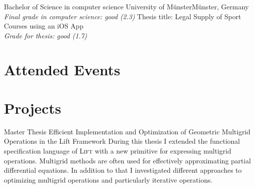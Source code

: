 \documentclass[11pt,a4paper,sans]{moderncv}        %
\newcommand{\Lift}{\textsc{Lift}\xspace}
\begin{document}
                        {Bachelor of Science in computer science}
					{University of Münster}{Münster, Germany}
					{\textit{Final grade in computer science: good (2.3)}}
					{Thesis title: Legal Supply of Sport Courses using an iOS App \\
					 \textit{Grade for thesis: good (1.7)}
					}
					
					

\section{Attended Events}


\printbibheading[title={Publications}]
%
\printbibliography[heading=none]





\section{Projects}
					{Master Thesis}
					{Efficient Implementation and Optimization of Geometric Multigrid Operations in the Lift Framework}{}
					{}
					{During this thesis I extended the functional specification language of \Lift with a new primitive for expressing multigrid operations. Multigrid methods are often used for effectively approximating partial differential equations. In addition to that I investigated different approaches to optimizing multigrid operations and particularly iterative operations.}
    
\end{document}

